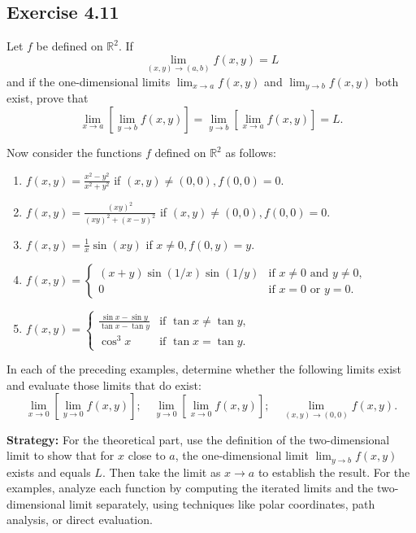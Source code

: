 \begin{problembox}
\begin{problemstatement}
\subsection*{Exercise 4.11}
    Let $f$ be defined on $\mathbb{R}^2$. If
    \[
    \lim_{(x, y) \to (a, b)} f(x, y) = L
    \]
    and if the one-dimensional limits $\lim_{x \to a} f(x, y)$ and $\lim_{y \to b} f(x, y)$ both exist, prove that
    \[
    \lim_{x \to a} \left[ \lim_{y \to b} f(x, y) \right] = \lim_{y \to b} \left[ \lim_{x \to a} f(x, y) \right] = L.
    \]
    
    Now consider the functions $f$ defined on $\mathbb{R}^2$ as follows:
    \begin{enumerate}[label=\alph*)]
        \item $f(x, y) = \frac{x^2 - y^2}{x^2 + y^2}$ if $(x, y) \neq (0, 0), f(0, 0) = 0.$
        \item $f(x, y) = \frac{(xy)^2}{(xy)^2 + (x - y)^2}$ if $(x, y) \neq (0, 0), f(0, 0) = 0.$
        \item $f(x, y) = \frac{1}{x} \sin (xy)$ if $x \neq 0, f(0, y) = y.$
        \item $f(x, y) = 
            \begin{cases}
                (x + y) \sin (1/x) \sin (1/y) & \text{if } x \neq 0 \text{ and } y \neq 0,\\
                0 & \text{if } x = 0 \text{ or } y = 0.
            \end{cases}$
        \item $f(x, y) = 
            \begin{cases}
                \frac{\sin x - \sin y}{\tan x - \tan y} & \text{if } \tan x \neq \tan y,\\
                \cos^3 x & \text{if } \tan x = \tan y.
            \end{cases}$
    \end{enumerate}
    
    In each of the preceding examples, determine whether the following limits exist and evaluate those limits that do exist:
    \[
    \lim_{x \to 0} \left[ \lim_{y \to 0} f(x, y) \right]; \quad \lim_{y \to 0} \left[ \lim_{x \to 0} f(x, y) \right]; \quad \lim_{(x, y) \to (0, 0)} f(x, y).
    \]
\end{problemstatement}
\end{problembox}

\noindent\textbf{Strategy:} For the theoretical part, use the definition of the two-dimensional limit to show that for $x$ close to $a$, the one-dimensional limit $\lim_{y \to b} f(x, y)$ exists and equals $L$. Then take the limit as $x \to a$ to establish the result. For the examples, analyze each function by computing the iterated limits and the two-dimensional limit separately, using techniques like polar coordinates, path analysis, or direct evaluation.

